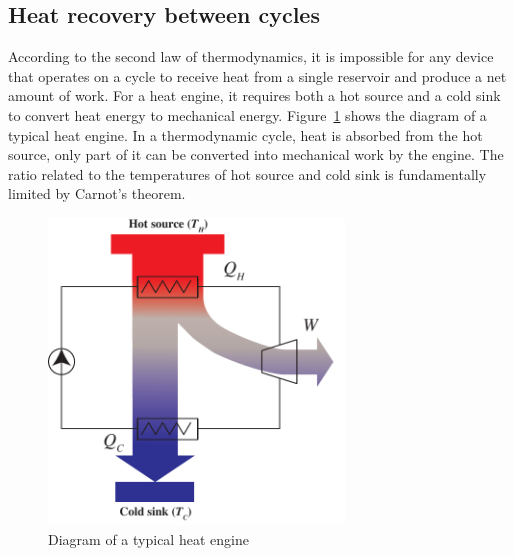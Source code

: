 %
\subsection{Heat recovery between cycles}
\label{sec:HRBC}

According to the second law of thermodynamics, it is impossible for any device that operates on a cycle to receive heat from a single reservoir and produce a net amount of work. For a heat engine, it requires both a hot source and a cold sink to convert heat energy to mechanical energy. 
Figure~\ref{fig:engines} shows the diagram of a typical heat engine. In a thermodynamic cycle, heat is absorbed from the hot source, only part of it can be converted into mechanical work by the engine. The ratio related to the temperatures of hot source and cold sink is fundamentally limited by Carnot's theorem.

\begin{figure}[h]
\centering 
\includegraphics[width=0.7\textwidth]{fig/engines}
\caption{Diagram of a typical heat engine}\label{fig:engines}
\end{figure}

